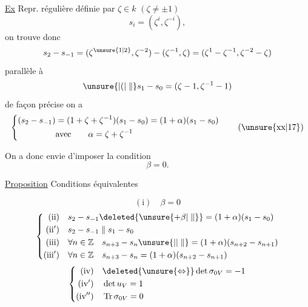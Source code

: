 \uline{Ex} Repr. régulière définie par $\zeta\in k$ $(\zeta\ne\pm1)$
\[ s_i=(\zeta^i,\zeta^{-i}), \]
on trouve donc
\[ s_2-s_{-1}=(\zeta^{\unsure{1|2}},\zeta^{-2})-(\zeta^{-1},\zeta)=(\zeta^{1}-\zeta^{-1},\zeta^{-2}-\zeta) \]
parallèle à
\[ \unsure{\vert(|\parallel}s_1-s_0=(\zeta-1,\zeta^{-1}-1) \]
de façon précise on a
\[ \left\{\begin{aligned}(s_2-s_{-1})&=(1+\zeta+\zeta^{-1})(s_1-s_0)=(1+\alpha)(s_1-s_0)\\
&\text{avec}\qquad \alpha=\zeta+\zeta^{-1}\end{aligned}\right. \tag*{(\unsure{xx|17})} \]
 

On a donc envie d'imposer la condition
\[ \beta=0. \]

\uline{Proposition} Conditions équivalentes

\[ (\mathrm i)\quad \beta=0 \]
\[ \left\{\begin{aligned}(\mathrm{ii})\quad &s_2-s_{-1}\deleted{\unsure{+\beta|\parallel}}=(1+\alpha)(s_1-s_0)\\
(\mathrm{ii}')\quad &s_2-s_{-1}\parallel s_1-s_0\\
(\mathrm{iii})\quad &\forall n\in\mathbb Z\quad s_{n+3}-s_n\unsure{\vert|\parallel}=(1+\alpha)(s_{n+2}-s_{n+1})\\
(\mathrm{iii}')\quad &\forall n\in\mathbb Z\quad s_{n+3}-s_n=(1+\alpha)(s_{n+2}-s_{n+1})\end{aligned}\right. \]
\[ \left\{\begin{aligned}(\mathrm{iv})\quad &\deleted{\unsure{\Leftrightarrow}}\det\sigma_{0V}=-1\\
(\mathrm{iv}')\quad &\det u_V=1\\
(\mathrm{iv}'')\quad &\operatorname{Tr}\sigma_{0V}=0\end{aligned}\right. \]
